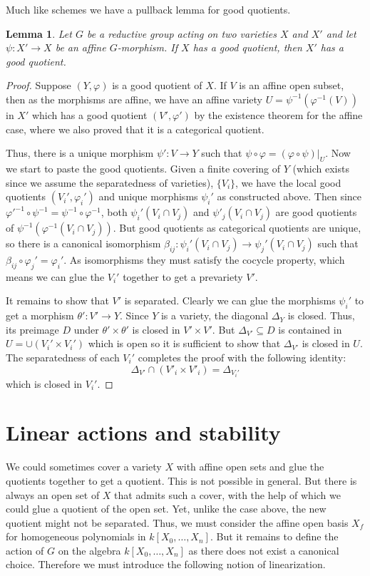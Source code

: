 \documentclass[12pt]{article}
\newtheorem{lemma}{Lemma}[section]
\theoremstyle{remark}
\theoremstyle{definition}
\newcommand{\D}[0]{\Delta}
\begin{document}
    Much like schemes we have a pullback lemma for good quotients.
    \begin{lemma}
        Let $G$ be a reductive group acting on two varieties $X$ and $X'$ and let $\psi:X'\to X$ be an affine $G$-morphism. If $X$ has a good quotient, then $X'$ has a good quotient.
    \end{lemma}
    \begin{proof}
        Suppose $(Y,\varphi)$ is a good quotient of $X$. If $V$ is an affine open subset, then as the morphisms are affine, we have an affine variety $U=\psi^{-1}(\varphi^{-1}(V))$ in $X'$ which has a good quotient $(V', \varphi')$ by the existence theorem for the affine case, where we also proved that it is a categorical quotient.

        Thus, there is a unique morphism $\psi':V\to Y$ such that $\psi\circ\varphi=(\varphi\circ\psi)|_U$. Now we start to paste the good quotients. Given a finite covering of $Y$ (which exists since we assume the separatedness of varieties), $\{V_i\}$, we have the local good quotients $(V_i',\varphi_i')$ and unique morphisms $\psi_i'$ as constructed above. Then since $\varphi'^{-1}\circ\psi^{-1}=\psi^{-1}\circ\varphi^{-1}$, both $\psi_i'(V_i\cap V_j)$ and $\psi'_j(V_i\cap V_j)$ are good quotients of $\psi^{-1}\left(\varphi^{-1}(V_i\cap V_j)\right)$. But good quotients as categorical quotients are unique, so there is a canonical isomorphism $\beta_{ij}:\psi_i'(V_i\cap V_j)\to \psi_j'(V_i\cap V_j)$ such that $\beta_{ij}\circ\varphi_j'=\varphi_i'$. As isomorphisms they must satisfy the cocycle property, which means we can glue the $V_i'$ together to get a prevariety $V'$.
        
        It remains to show that $V'$ is separated. Clearly we can glue the morphisms $\psi_i'$ to get a morphism $\theta':V'\to Y$. Since $Y$ is a variety, the diagonal $\D_Y$ is closed. Thus, its preimage $D$ under $\theta'\times\theta'$ is closed in $V'\times V'$. But $\D_{V'}\subseteq D$ is contained in $U=\cup(V_i'\times V_i')$ which is open so it is sufficient to show that $\D_{V'}$ is closed in $U$. The separatedness of each $V_i'$ completes the proof with the following identity:
        \[\D_{V'}\cap (V'_i\times V'_i)=\D_{V_i'}\]
        which is closed in $V_i'$.
    \end{proof}
    \section{Linear actions and stability}
    We could sometimes cover a variety $X$ with affine open sets and glue the quotients together to get a quotient. This is not possible in general. But there is always an open set of $X$ that admits such a cover, with the help of which we could glue a quotient of the open set. Yet, unlike the case above, the new quotient might not be separated. Thus, we must consider the affine open basis $X_f$ for homogeneous polynomials in $k[X_0,\dots, X_n]$. But it remains to define the action of $G$ on the algebra $k[X_0,\dots, X_n]$ as there does not exist a canonical choice. Therefore we must introduce the following notion of linearization.
\end{document}
